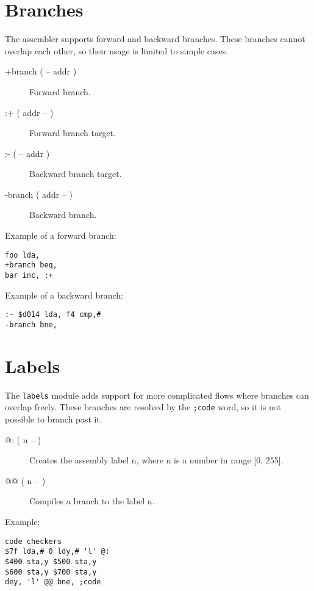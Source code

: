 \section{Branches}

The assembler supports forward and backward branches. These branches cannot overlap each other, so their usage is limited to simple cases.

\begin{description}
    \item[+branch ( -- addr )] Forward branch.
    \item[:+ ( addr -- )] Forward branch target.
    \item[:- ( -- addr )] Backward branch target.
    \item[-branch ( addr -- )] Backward branch.
\end{description}

Example of a forward branch:

\begin{verbatim}
foo lda,
+branch beq,
bar inc, :+
\end{verbatim}

Example of a backward branch:

\begin{verbatim}
:- $d014 lda, f4 cmp,#
-branch bne,
\end{verbatim}

\section{Labels}

The \texttt{labels} module adds support for more complicated flows where branches can overlap freely. These branches are resolved by the \texttt{;code} word, so it is not possible to branch past it.

\begin{description}
    \item[@: ( n -- )] Creates the assembly label n, where n is a number in range [0, 255].
    \item[@@ ( n -- )] Compiles a branch to the label n.
\end{description}

Example:

\begin{verbatim}
code checkers
$7f lda,# 0 ldy,# 'l' @:
$400 sta,y $500 sta,y
$600 sta,y $700 sta,y
dey, 'l' @@ bne, ;code
\end{verbatim}
